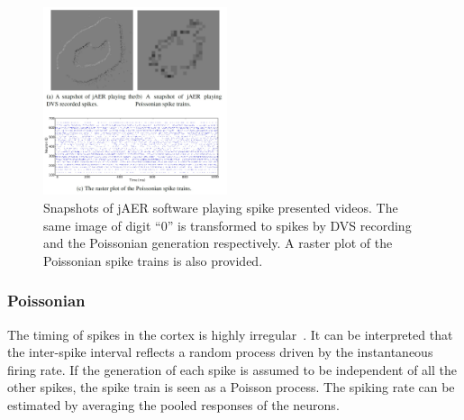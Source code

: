 \documentclass{frontiersENG} %
\begin{document}
\begin{figure}[hbt]
	\centering
	\includegraphics[width=0.48\textwidth]{fig1}
	\caption{
		Snapshots of jAER software playing spike presented videos.
		The same image of digit ``0'' is transformed to spikes by DVS recording and the Poissonian generation respectively.
		A raster plot of the Poissonian spike trains is also provided.}
	\label{fig:zero}
\end{figure}

\subsubsection{Poissonian}
\label{sec:poissonian}
The timing of spikes in the cortex is highly irregular~\citep{squire1998findings}.
It can be interpreted that the inter-spike interval reflects a random process driven by the instantaneous firing rate.
If the generation of each spike is assumed to be independent of all the other spikes, the spike train is seen as a Poisson process.
The spiking rate can be estimated by averaging the pooled responses of the neurons.
\end{document}

